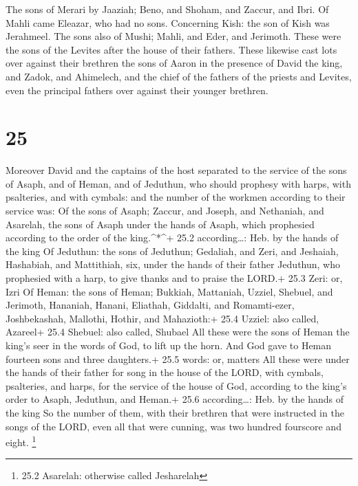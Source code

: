  The sons of Merari by Jaaziah; Beno, and Shoham, and
Zaccur, and Ibri.  Of Mahli came Eleazar, who had no sons.
 Concerning Kish: the son of Kish was Jerahmeel.
 The sons also of Mushi; Mahli, and Eder, and Jerimoth.
These were the sons of the Levites after the house of their fathers.
 These likewise cast lots over against their brethren the
sons of Aaron in the presence of David the king, and Zadok, and
Ahimelech, and the chief of the fathers of the priests and Levites, even
the principal fathers over against their younger brethren.

\hypertarget{section-24}{%
\section{25}\label{section-24}}

 Moreover David and the captains of the host separated to
the service of the sons of Asaph, and of Heman, and of Jeduthun, who
should prophesy with harps, with psalteries, and with cymbals: and the
number of the workmen according to their service was:  Of
the sons of Asaph; Zaccur, and Joseph, and Nethaniah, and Asarelah, the
sons of Asaph under the hands of Asaph, which prophesied according to
the order of the king.\^{}*\^{}+ 25.2 according\ldots: Heb. by the hands
of the king  Of Jeduthun: the sons of Jeduthun; Gedaliah,
and Zeri, and Jeshaiah, Hashabiah, and Mattithiah, six, under the hands
of their father Jeduthun, who prophesied with a harp, to give thanks and
to praise the LORD.+ 25.3 Zeri: or, Izri  Of Heman: the sons
of Heman; Bukkiah, Mattaniah, Uzziel, Shebuel, and Jerimoth, Hananiah,
Hanani, Eliathah, Giddalti, and Romamti-ezer, Joshbekashah, Mallothi,
Hothir, and Mahazioth:+ 25.4 Uzziel: also called, Azareel+ 25.4 Shebuel:
also called, Shubael  All these were the sons of Heman the
king's seer in the words of God, to lift up the horn. And God gave to
Heman fourteen sons and three daughters.+ 25.5 words: or, matters
 All these were under the hands of their father for song in
the house of the LORD, with cymbals, psalteries, and harps, for the
service of the house of God, according to the king's order to Asaph,
Jeduthun, and Heman.+ 25.6 according\ldots: Heb. by the hands of the
king  So the number of them, with their brethren that were
instructed in the songs of the LORD, even all that were cunning, was two
hundred fourscore and eight. \footnote{25.2 Asarelah: otherwise called
  Jesharelah}

